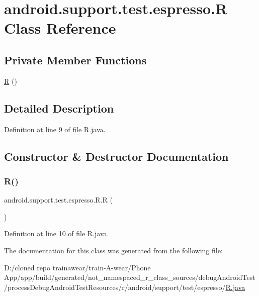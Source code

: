 \hypertarget{classandroid_1_1support_1_1test_1_1espresso_1_1_r}{}\section{android.\+support.\+test.\+espresso.\+R Class Reference}
\label{classandroid_1_1support_1_1test_1_1espresso_1_1_r}
\subsection*{Private Member Functions}
\begin{DoxyCompactItemize}
\item 
\mbox{\hyperlink{classandroid_1_1support_1_1test_1_1espresso_1_1_r_a216661d099c38a4a019e9ec225415d46}{R}} ()
\end{DoxyCompactItemize}


\subsection{Detailed Description}


Definition at line 9 of file R.\+java.



\subsection{Constructor \& Destructor Documentation}
\mbox{\label{classandroid_1_1support_1_1test_1_1espresso_1_1_r_a216661d099c38a4a019e9ec225415d46}} 
\subsubsection{\texorpdfstring{R()}{R()}}
{\footnotesize\ttfamily android.\+support.\+test.\+espresso.\+R.\+R (\begin{DoxyParamCaption}{ }\end{DoxyParamCaption})\hspace{0.3cm}{\ttfamily [private]}}



Definition at line 10 of file R.\+java.


\begin{DoxyCode}{0}

\end{DoxyCode}


The documentation for this class was generated from the following file\+:\begin{DoxyCompactItemize}
\item 
D\+:/cloned repo trainawear/train-\/\+A-\/wear/\+Phone App/app/build/generated/not\+\_\+namespaced\+\_\+r\+\_\+class\+\_\+sources/debug\+Android\+Test/process\+Debug\+Android\+Test\+Resources/r/android/support/test/espresso/\mbox{\hyperlink{ndroid_test_2process_debug_android_test_resources_2r_2android_2support_2test_2espresso_2_r_8java}{R.\+java}}\end{DoxyCompactItemize}
